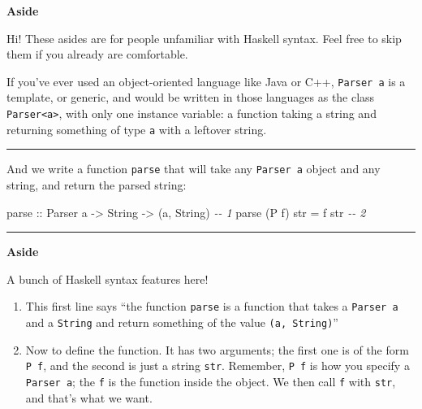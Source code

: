 \documentclass[]{article}
\newenvironment{Shaded}{}{}
\newcommand{\CommentTok}[1]{\textcolor[rgb]{0.38,0.63,0.69}{\textit{#1}}}
\newcommand{\DataTypeTok}[1]{\textcolor[rgb]{0.56,0.13,0.00}{#1}}
\newcommand{\NormalTok}[1]{#1}
\newcommand{\OtherTok}[1]{\textcolor[rgb]{0.00,0.44,0.13}{#1}}
\begin{document}
\textbf{Aside}

Hi! These asides are for people unfamiliar with Haskell syntax. Feel free to
skip them if you already are comfortable.

If you've ever used an object-oriented language like Java or C++,
\texttt{Parser\ a} is a template, or generic, and would be written in those
languages as the class \texttt{Parser\textless{}a\textgreater{}}, with only one
instance variable: a function taking a string and returning something of type
\texttt{a} with a leftover string.

\begin{center}\rule{0.5\linewidth}{\linethickness}\end{center}

And we write a function \texttt{parse} that will take any \texttt{Parser\ a}
object and any string, and return the parsed string:

\begin{Shaded}
\begin{Highlighting}[]
\OtherTok{parse ::} \DataTypeTok{Parser}\NormalTok{ a }\OtherTok{{-}>} \DataTypeTok{String} \OtherTok{{-}>}\NormalTok{ (a, }\DataTypeTok{String}\NormalTok{)              }\CommentTok{{-}{-} 1}
\NormalTok{parse (}\DataTypeTok{P}\NormalTok{ f) str }\OtherTok{=}\NormalTok{ f str                                 }\CommentTok{{-}{-} 2}
\end{Highlighting}
\end{Shaded}

\begin{center}\rule{0.5\linewidth}{\linethickness}\end{center}

\textbf{Aside}

A bunch of Haskell syntax features here!

\begin{enumerate}
\def\labelenumi{\arabic{enumi}.}
\item
  This first line says ``the function \texttt{parse} is a function that takes a
  \texttt{Parser\ a} and a \texttt{String} and return something of the value
  \texttt{(a,\ String)}''
\item
  Now to define the function. It has two arguments; the first one is of the form
  \texttt{P\ f}, and the second is just a string \texttt{str}. Remember,
  \texttt{P\ f} is how you specify a \texttt{Parser\ a}; the \texttt{f} is the
  function inside the object. We then call \texttt{f} with \texttt{str}, and
  that's what we want.
\end{enumerate}
\end{document}
